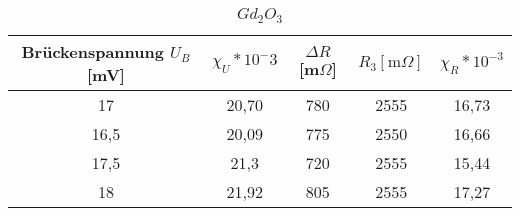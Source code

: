 \begin{table}[h]
	\begin{center}
		\begin{tabular}{cc|ccc}
			Brückenspannung $U_B$ [mV]&$\chi_{U}*10^-3$ & $\Delta R$ [m$\Omega$]&$R_3[\text{m}\Omega]$&$\chi_R*10^{-3}$\\ \hline
			17&	20,70&780&2555&16,73\\
			16,5&20,09&775&2550&16,66\\
			17,5&21,3&720&2555&15,44\\
			18&	21,92&805&2555&17,27
		\end{tabular}
		\caption{$Gd_2O_3$}
		\label{tab3}
	\end{center}
\end{table}